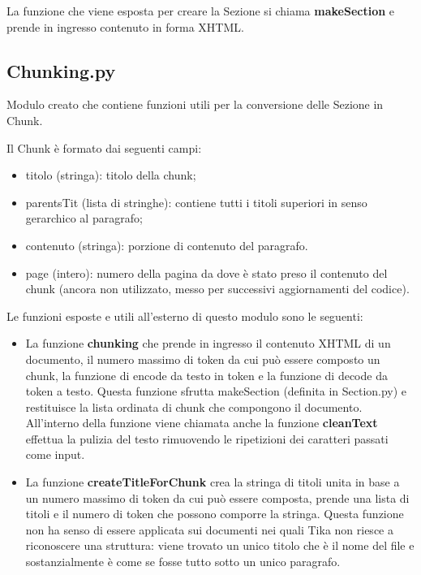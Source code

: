 La funzione che viene esposta per creare la Sezione si chiama \textbf{makeSection} e prende in ingresso contenuto in forma XHTML.

\subsection{Chunking.py}
Modulo creato che contiene funzioni utili per la conversione delle Sezione in Chunk.

Il Chunk è formato dai seguenti campi:
\begin{itemize}
    \item titolo (stringa): titolo della chunk;
    \item parentsTit (lista di stringhe): contiene tutti i titoli superiori in senso gerarchico al paragrafo;
    \item contenuto (stringa): porzione di contenuto del paragrafo.
    \item page (intero): numero della pagina da dove è stato preso il contenuto del chunk (ancora non utilizzato, messo per successivi aggiornamenti del codice). 
\end{itemize}

Le funzioni esposte e utili all'esterno di questo modulo sono le seguenti:
\begin{itemize}
    \item La funzione \textbf{chunking} che prende in ingresso il contenuto XHTML di un documento, il numero massimo di token da cui può essere composto un chunk, la funzione di encode da testo in token e la funzione di decode da token a testo.
    Questa funzione sfrutta makeSection (definita in Section.py) e restituisce la lista ordinata di chunk che compongono il documento.
    All'interno della funzione viene chiamata anche la funzione \textbf{cleanText} effettua la pulizia del testo rimuovendo le ripetizioni dei caratteri passati come input.
    \item La funzione \textbf{createTitleForChunk} crea la stringa di titoli unita in base a un numero massimo di token da cui può essere composta, prende una lista di titoli e il numero di token che possono comporre la stringa.
    Questa funzione non ha senso di essere applicata sui documenti nei quali Tika non riesce a riconoscere una struttura: viene trovato un unico titolo che è il nome del file e sostanzialmente è come se fosse tutto sotto un unico paragrafo.
\end{itemize}

